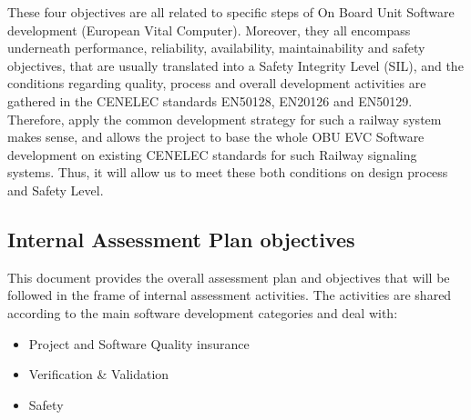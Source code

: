 \documentclass{template/openetcs_article}
\begin{document}
These four objectives are all related to specific steps of On Board Unit Software development (European Vital Computer). Moreover, they all encompass underneath performance, reliability, availability, maintainability and safety objectives, that are usually translated into a Safety Integrity Level (SIL), and the conditions regarding quality, process and overall development activities are gathered in the CENELEC standards EN50128, EN20126 and EN50129.
Therefore, apply the common development strategy for such a railway system makes sense, and allows the project to base the whole OBU EVC Software development on existing CENELEC standards for such Railway signaling systems. Thus, it will allow us to meet these both conditions on design process and Safety Level.

\subsection{Internal Assessment Plan objectives}
This document provides the overall assessment plan and objectives that will be followed in the frame of internal assessment activities.
The activities are shared according to the main software development categories and deal with:
\begin{itemize}
\item Project and Software Quality insurance
\item Verification \& Validation
\item Safety
\end{itemize}
\end{document}
